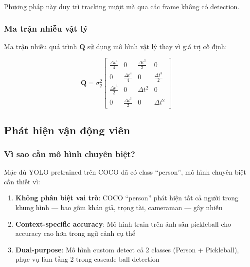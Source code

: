 \documentclass[12pt,a4paper]{article}
\begin{document}
Phương pháp này duy trì tracking mượt mà qua các frame không có detection.

\subsubsection{Ma trận nhiễu vật lý}
Ma trận nhiễu quá trình $\mathbf{Q}$ sử dụng mô hình vật lý thay vì giá trị cố định:

\begin{equation}
\mathbf{Q} = \sigma_q^2 \begin{bmatrix}
    \frac{\Delta t^4}{4} & 0 & \frac{\Delta t^3}{2} & 0 \\
    0 & \frac{\Delta t^4}{4} & 0 & \frac{\Delta t^3}{2} \\
    \frac{\Delta t^3}{2} & 0 & \Delta t^2 & 0 \\
    0 & \frac{\Delta t^3}{2} & 0 & \Delta t^2
\end{bmatrix}
\end{equation}

\subsection{Phát hiện vận động viên}
\label{sec:player_detection}

\subsubsection{Vì sao cần mô hình chuyên biệt?}
Mặc dù YOLO pretrained trên COCO đã có class ``person'', mô hình chuyên biệt cần thiết vì:
\begin{enumerate}[noitemsep]
    \item \textbf{Không phân biệt vai trò}: COCO ``person'' phát hiện tất cả người trong khung hình --- bao gồm khán giả, trọng tài, cameraman --- gây nhiễu
    \item \textbf{Context-specific accuracy}: Mô hình train trên ảnh sân pickleball cho accuracy cao hơn trong ngữ cảnh cụ thể
    \item \textbf{Dual-purpose}: Mô hình custom detect cả 2 classes (Person + Pickleball), phục vụ làm tầng 2 trong cascade ball detection
\end{enumerate}
\end{document}
